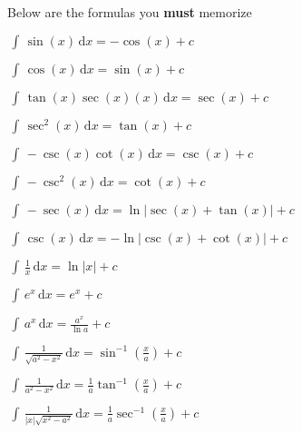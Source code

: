 \documentclass[addpoints]{exam}
\theoremstyle{definition}
\theoremstyle{plain}
\begin{document}
\newpage 

\begin{tcolorbox}[breakable, title=\subsection{INTEGRATION FORMULAS}, colframe=black, sharp corners, colback=Azure4!30, colbacktitle=Firebrick2!60, coltitle=black]
    Below are the formulas you \textbf{must} memorize
    \begin{enumerate}
        \begin{minipage}{0.45\linewidth}
            \item $\displaystyle\,\int\,\sin\left(x\right)\,\mathrm{d}x = -\cos\left(x\right) + c$
            \item $\displaystyle\,\int\,\cos\left(x\right)\,\mathrm{d}x = \sin\left(x\right) + c$
            \item $\displaystyle\,\int\,\tan\left(x\right)\sec\left(x\right)\left(x\right)\,\mathrm{d}x = \sec\left(x\right) + c$
            \item $\displaystyle\,\int\,\sec^{2}\left(x\right)\,\mathrm{d}x = \tan\left(x\right) + c$
            \item $\displaystyle\,\int\,-\csc\left(x\right)\cot\left(x\right)\,\mathrm{d}x = \csc\left(x\right) + c$
            \item $\displaystyle\,\int\,-\csc^{2}\left(x\right)\,\mathrm{d}x = \cot\left(x\right) + c$
            \item $\displaystyle\,\int\,-\sec\left(x\right)\,\mathrm{d}x = \ln\left|\sec\left(x\right) + \tan\left(x\right)\right| + c$
        \end{minipage}
        \hfill 
        \begin{minipage}{0.45\linewidth}
            \item $\displaystyle\,\int\,\csc\left(x\right)\,\mathrm{d}x = -\ln\left|\csc\left(x\right) + \cot\left(x\right)\right| + c$
            \item $\displaystyle\,\int\,\frac{1}{x}\,\mathrm{d}x = \ln\left|x\right| + c$
            \item $\displaystyle\,\int\,e^{x}\,\mathrm{d}x = e^{x} + c$
            \item $\displaystyle\,\int\,a^{x}\,\mathrm{d}x = \frac{a^{x}}{\ln a} + c$
            \item $\displaystyle\,\int\,\frac{1}{\sqrt{a^2-x^2}}\,\mathrm{d}x = \sin^{-1}\left(\frac{x}{a}\right) + c$
            \item $\displaystyle\,\int\,\frac{1}{{a^2-x^2}}\,\mathrm{d}x = \frac{1}{a}\tan^{-1}\left(\frac{x}{a}\right) + c$
            \item $\displaystyle\,\int\,\frac{1}{\left|x\right|\sqrt{x^2-a^2}}\,\mathrm{d}x = \frac{1}{a}\sec^{-1}\left(\frac{x}{a}\right) + c$
        \end{minipage}
    \end{enumerate}
\end{tcolorbox}
\end{document}
